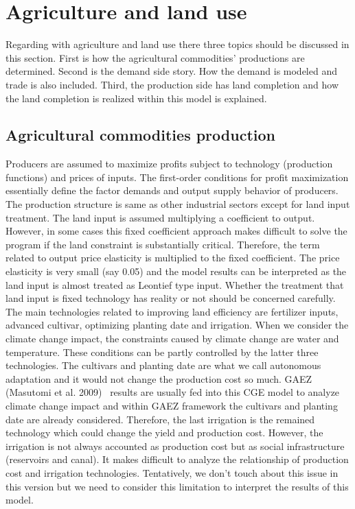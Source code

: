 \documentclass[10pt,a4paper,titlepage,dvipdfmx]{book}
\begin{document}
\section{\label{sec:AgrLanUse}{Agriculture and land use}}

Regarding with agriculture and land use there three topics should be discussed in this section. First is how the agricultural commodities' productions are determined. Second is the demand side story. How the demand is modeled and trade is also included. Third, the production side has land completion and how the land completion is realized within this model is explained.

\subsection{\label{subsec:AgrComPro}{Agricultural commodities production}}

Producers are assumed to maximize profits subject to technology (production functions) and prices of inputs. The first-order conditions for profit maximization essentially define the factor demands and output supply behavior of producers. The production structure is same as other industrial sectors except for land input treatment. The land input is assumed multiplying a coefficient to output. However, in some cases this fixed coefficient approach makes difficult to solve the program if the land constraint is substantially critical. Therefore, the term related to output price elasticity is multiplied to the fixed coefficient. The price elasticity is very small (say 0.05) and the model results can be interpreted as the land input is almost treated as Leontief type input. Whether the treatment that land input is fixed technology has reality or not should be concerned carefully. The main technologies related to improving land efficiency are fertilizer inputs, advanced cultivar, optimizing planting date and irrigation. When we consider the climate change impact, the constraints caused by climate change are water and temperature. These conditions can be partly controlled by the latter three technologies. The cultivars and planting date are what we call autonomous adaptation and it would not change the production cost so much. GAEZ (Masutomi et al. 2009)~\cite{RN2253} results are usually fed into this CGE model to analyze climate change impact and within GAEZ framework the cultivars and planting date are already considered. Therefore, the last irrigation is the remained technology which could change the yield and production cost. However, the irrigation is not always accounted as production cost but as social infrastructure (reservoirs and canal). It makes difficult to analyze the relationship of production cost and irrigation technologies. Tentatively, we don't touch about this issue in this version but we need to consider this limitation to interpret the results of this model.
\end{document}
